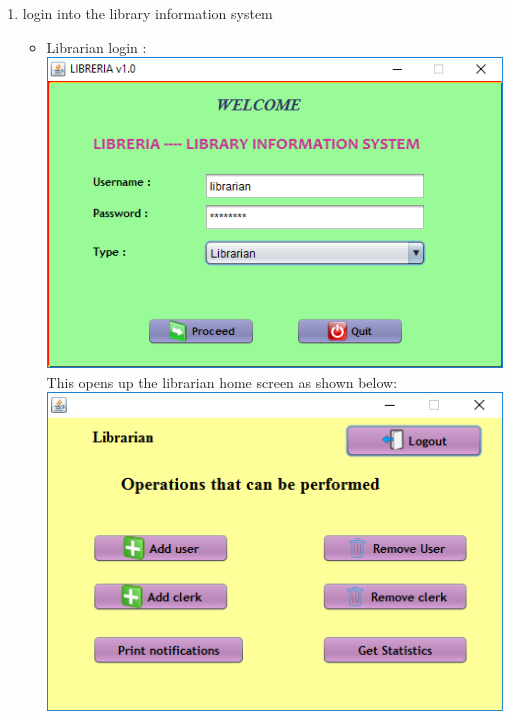 \documentclass{article}
\begin{document}
\begin{enumerate}
\item login into the library information system 
\begin{itemize}
\item Librarian login :\\
\includegraphics[scale=0.8]{images/LibrarianLogin/Login.PNG}
\\This opens up the librarian home screen as shown below:\\
\includegraphics[scale=0.8]{images/LibrarianLogin/LibrarianHomeScreen.PNG}


\end{itemize}
\end{enumerate}
\end{document}
